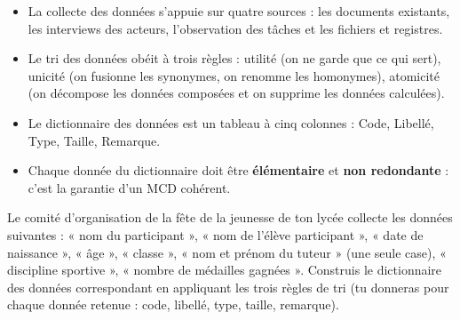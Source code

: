 \documentclass[11pt]{article}
\newcommand{\cle}[1]{{\popxbold\color{popdark}#1}}
\begin{document}
\begin{aretenir}
\begin{itemize}
  \item La collecte des données s'appuie sur quatre sources : les \cle{documents existants}, les \cle{interviews des acteurs}, l'\cle{observation des tâches} et les \cle{fichiers et registres}.
  \item Le tri des données obéit à trois règles : \cle{utilité} (on ne garde que ce qui sert), \cle{unicité} (on fusionne les synonymes, on renomme les homonymes), \cle{atomicité} (on décompose les données composées et on supprime les données calculées).
  \item Le \cle{dictionnaire des données} est un tableau à cinq colonnes : Code, Libellé, Type, Taille, Remarque.
  \item Chaque donnée du dictionnaire doit être \textbf{élémentaire} et \textbf{non redondante} : c'est la garantie d'un MCD cohérent.
\end{itemize}
\end{aretenir}

\begin{exercice}
Le comité d'organisation de la fête de la jeunesse de ton lycée collecte les données suivantes : « nom du participant », « nom de l'élève participant », « date de naissance », « âge », « classe », « nom et prénom du tuteur » (une seule case), « discipline sportive », « nombre de médailles gagnées ». Construis le dictionnaire des données correspondant en appliquant les trois règles de tri (tu donneras pour chaque donnée retenue : code, libellé, type, taille, remarque).
\end{exercice}
\end{document}
